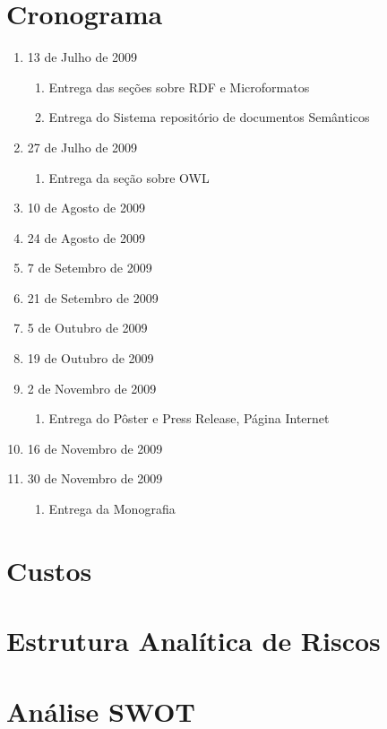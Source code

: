 \documentclass[]{article}
\begin{document}

\section{Cronograma} %
\label{sec:cronograma}

\begin{enumerate}
  \item 13 de Julho de 2009
  \begin{enumerate}
    \item Entrega das seções sobre RDF e Microformatos
    \item Entrega do Sistema repositório de documentos Semânticos
  \end{enumerate}
  \item 27 de Julho de 2009
  \begin{enumerate}
    \item Entrega da seção sobre OWL
  \end{enumerate}
  \item 10 de Agosto de 2009
  \item 24 de Agosto de 2009
  \item 7 de Setembro de 2009
  \item 21 de Setembro de 2009
  \item 5 de Outubro de 2009
  \item 19 de Outubro de 2009
  \item 2 de Novembro de 2009
  \begin{enumerate}
    \item Entrega do Pôster e Press Release, Página Internet
  \end{enumerate}
  \item 16 de Novembro de 2009
  \item 30 de Novembro de 2009
  \begin{enumerate}
    \item Entrega da Monografia
  \end{enumerate}
\end{enumerate}



\section{Custos} %
\label{sec:custos}



\section{Estrutura Analítica de Riscos} %
\label{sec:estrutura_analitica_de_riscos}


\section{Análise SWOT} %
\label{sec:analise_swot}




\end{document}
